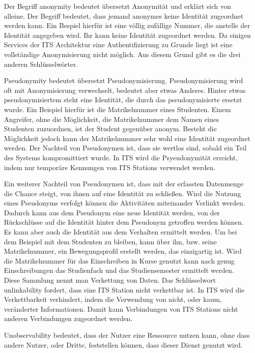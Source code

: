 Der Begriff anonymity bedeutet übersetzt Anonymität und erklärt sich von alleine. Der Begriff bedeutet, dass jemand anonymes keine Identität zugeordnet werden kann. Ein Bespiel hierfür ist eine völlig zufällige Nummer, die anstelle der Identität angegeben wird. Ihr kann keine Identität zugeordnet werden. Da einigen Services der \ac{ITS} Architektur eine Authentifizierung zu Grunde liegt ist eine vollständige Anonymisierung nicht möglich. Aus diesem Grund gibt es die drei anderen Schlüsselwörter. 

Pseudonymity bedeutet übersetzt Pseudonymisierung.  Pseudonymisierung wird oft mit Anonymisierung verwechselt, bedeutet aber etwas Anderes. Hinter etwas pseudonymisiertem steht eine Identität, die durch das  pseudonymisierte ersetzt wurde. Ein Beispiel hierfür ist die Matrikelnummer eines Studenten. Einem Angreifer, ohne die Möglichkeit, die Matrikelnummer dem Namen eines Studenten zuzuordnen, ist der Student gegenüber anonym. Besteht die Möglichkeit jedoch kann der Matrikelnummer sehr wohl eine Identität zugeordnet werden. Der Nachteil von Pseudonymen ist, dass sie wertlos sind, sobald ein Teil des Systems kompromittiert wurde. In \ac{ITS} wird die  Psyeudonymität erreicht, indem nur temporäre Kennungen von \ac{ITS} Stations verwendet werden.

Ein weiterer Nachteil von Pseudonymen ist, dass mit der erfassten Datenmenge die Chance steigt, von ihnen auf eine Identität zu schließen. Wird die Nutzung eines Pseudonyms verfolgt können die Aktivitäten miteinander Verlinkt werden. Dadurch kann aus dem Pseudonym eine neue Identität werden, von der Rückschlüsse auf die Identität hinter dem Pseudonym getroffen werden können. Es kann aber auch die Identität aus dem Verhalten ermittelt werden. Um bei dem Beispiel mit dem Studenten zu bleiben, kann über ihn, bzw. seine Matrikelnummer, ein Bewegungsprofil erstellt werden, das  einzigartig ist. Wird die Matrikelnummer für das Einschreiben in Kurse genutzt kann nach genug Einschreibungen das Studienfach und das Studiensemester ermittelt werden. Diese Sammlung nennt man Verkettung von Daten. Das Schlüsselwort unlinkability fordert, dass eine \ac{ITS} Station nicht verkettbar ist. In \ac{ITS} wird die Verkettbarkeit verhindert, indem die Verwendung von nicht, oder kaum, veränderter Informationen. Damit kann Verbindungen von \ac{ITS} Stations nicht anderen Verbindungen zugeordnet werden.

Unobservability bedeutet, dass der Nutzer eine Ressource nutzen kann, ohne dass andere Nutzer, oder Dritte, feststellen können, dass dieser Dienst genutzt wird.

